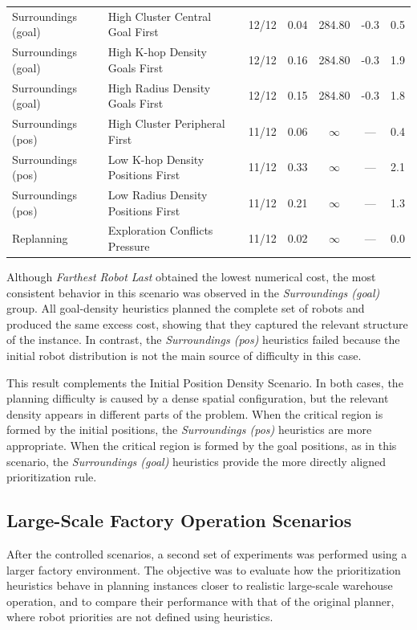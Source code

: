 \begin{table}[H]
\begin{tabular}{@{}llccccc@{}}
\midrule

Surroundings (goal) & High Cluster Central Goal First & 12/12 & 0.04 & 284.80 & -0.3 & 0.5 \\
Surroundings (goal) & High K-hop Density Goals First & 12/12 & 0.16 & 284.80 & -0.3 & 1.9 \\
Surroundings (goal) & High Radius Density Goals First & 12/12 & 0.15 & 284.80 & -0.3 & 1.8 \\

\midrule

Surroundings (pos) & High Cluster Peripheral First & 11/12 & 0.06 & $\infty$ & --- & 0.4 \\
Surroundings (pos) & Low K-hop Density Positions First & 11/12 & 0.33 & $\infty$ & --- & 2.1 \\
Surroundings (pos) & Low Radius Density Positions First & 11/12 & 0.21 & $\infty$ & --- & 1.3 \\

\midrule

Replanning & Exploration Conflicts Pressure & 11/12 & 0.02 & $\infty$ & --- & 0.0 \\

\bottomrule
\end{tabular}
\end{table}




Although \textit{Farthest Robot Last} obtained the lowest numerical cost, the most consistent
behavior in this scenario was observed in the \textit{Surroundings (goal)} group. All goal-density
heuristics planned the complete set of robots and produced the same excess cost, showing that they
captured the relevant structure of the instance. In contrast, the \textit{Surroundings (pos)} heuristics
failed because the initial robot distribution is not the main source of difficulty in this case.

This result complements the Initial Position Density Scenario. In both cases, the planning
difficulty is caused by a dense spatial configuration, but the relevant density appears in different
parts of the problem. When the critical region is formed by the initial positions, the
\textit{Surroundings (pos)} heuristics are more appropriate. When the critical region is formed by the
goal positions, as in this scenario, the \textit{Surroundings (goal)} heuristics provide the more
directly aligned prioritization rule.


\subsection{Large-Scale Factory Operation Scenarios}
\label{subsec:large_scale_factory_operation_scenarios}
\hspace{\parindent}
After the controlled scenarios, a second set of experiments was performed using a larger
factory environment. The objective was to evaluate how the prioritization heuristics behave in planning instances closer to realistic large-scale warehouse operation, and to compare their performance with that of the original planner, where robot priorities are not defined using heuristics.

